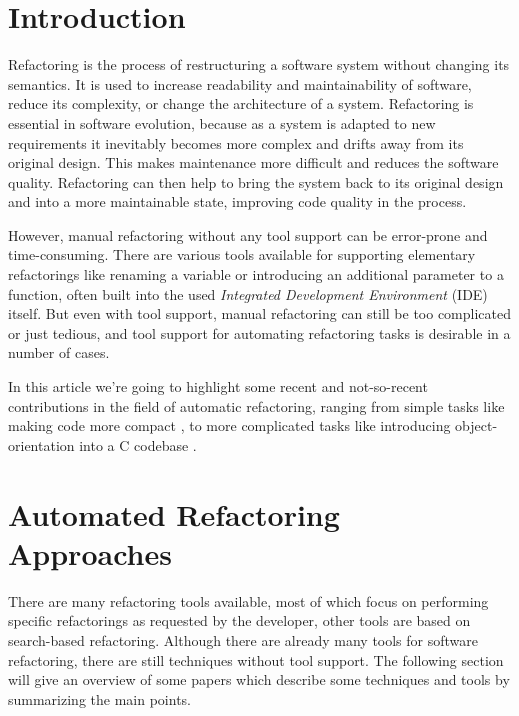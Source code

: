 \documentclass[conference,compsoc,a4paper]{IEEEtran}
\begin{document}
\section{Introduction}

Refactoring is the process of restructuring a software system without changing its semantics. It is used to increase 
readability and maintainability of software, reduce its complexity, or change the architecture of a system. Refactoring 
is essential in software evolution, because as a system is adapted to new requirements it inevitably becomes more 
complex and drifts away from its original design. This makes maintenance more difficult and reduces the software 
quality. Refactoring can then help to bring the system back to its original design and into a more maintainable state, 
improving code quality in the process.

However, manual refactoring without any tool support can be error-prone and time-consuming. There are various tools 
available for supporting elementary refactorings like renaming a variable or introducing an additional parameter to a 
function, often built into the used \emph{Integrated Development Environment} (IDE) itself. But even with tool support, 
manual refactoring can still be too complicated or just tedious, and tool support for automating refactoring tasks is 
desirable in a number of cases.

In this article we're going to highlight some recent and not-so-recent contributions in the field of automatic 
refactoring, ranging from simple tasks like making code more compact \cite{sparta}, to more complicated tasks like 
introducing object-orientation into a C codebase \cite{cpp}.


\section{Automated Refactoring Approaches}

There are many refactoring tools available, most of which focus on performing specific refactorings as requested by the
developer, other tools are based on search-based refactoring. Although there are already many tools for software 
refactoring, there are still techniques without tool support. The following section will give an overview of some 
papers which describe some techniques and tools by summarizing the main points.
\end{document}
